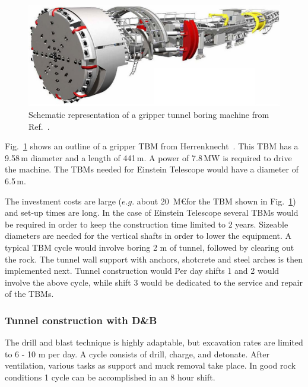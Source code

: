 \begin{figure}[htbp!]
\centering
\includegraphics[width=14cm]{./Sec_SiteInfra/Figures/tbm.jpg}
\caption{Schematic representation of a gripper tunnel boring machine from Ref.~\cite{Herrenknecht}.}
\label{fig:tbm}
\end{figure}
Fig.~\ref{fig:tbm} shows an outline of a gripper TBM from Herrenknecht~\cite{Herrenknecht}.
This TBM has a 9.58\,m diameter and a length of 441\,m.  A power of 7.8\,MW is required
to drive the machine. The TBMs needed for Einstein Telescope would have a diameter of 6.5\,m.

The investment costs are large ($e.g.$ about 20\, M\euro for the TBM shown in Fig.~\ref{fig:tbm}) and set-up times are long. In the case of Einstein Telescope several TBMs would be required in order to  keep the construction time limited to 2 years. Sizeable diameters are needed for the vertical shafts in order to lower the equipment. A typical TBM cycle would involve boring 2 m of tunnel, followed by clearing out the rock. The tunnel wall support with anchors, shotcrete and steel arches is then implemented next. Tunnel construction would Per day shifts 1 and 2 would involve the above cycle, while shift 3 would be dedicated to the service and repair of the TBMs.

\FloatBarrier
\subsubsection*{Tunnel construction with D\&B}
 
The drill and blast technique is highly adaptable, but excavation rates are
limited to 6 - 10 m per day. A cycle consists of drill, charge, and detonate.
After ventilation, various tasks as support and muck removal take place. In good
rock conditions 1 cycle can be accomplished in an 8 hour shift.

